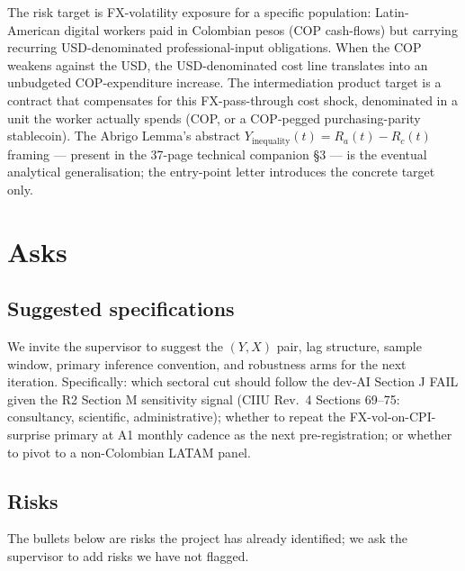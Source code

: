 The risk target is FX-volatility exposure for a specific population: Latin-American digital workers paid in Colombian pesos (COP cash-flows) but carrying recurring USD-denominated professional-input obligations. When the COP weakens against the USD, the USD-denominated cost line translates into an unbudgeted COP-expenditure increase. The intermediation product target is a contract that compensates for this FX-pass-through cost shock, denominated in a unit the worker actually spends (COP, or a COP-pegged purchasing-parity stablecoin). The Abrigo Lemma's abstract \(Y_{\mathrm{inequality}}(t) = R_a(t) - R_c(t)\) framing --- present in the 37-page technical companion \S3 --- is the eventual analytical generalisation; the entry-point letter introduces the concrete target only.

\section{Asks}\label{sec:4}

\subsection{Suggested specifications}\label{sec:4-specs}

We invite the supervisor to suggest the \((Y, X)\) pair, lag structure, sample window, primary inference convention, and robustness arms for the next iteration. Specifically: which sectoral cut should follow the dev-AI Section J FAIL given the R2 Section M sensitivity signal (CIIU Rev.~4 Sections 69--75: consultancy, scientific, administrative); whether to repeat the FX-vol-on-CPI-surprise primary at A1 monthly cadence as the next pre-registration; or whether to pivot to a non-Colombian LATAM panel.

\subsection{Risks}\label{sec:4-risks}

The bullets below are risks the project has already identified; we ask the supervisor to add risks we have not flagged.

